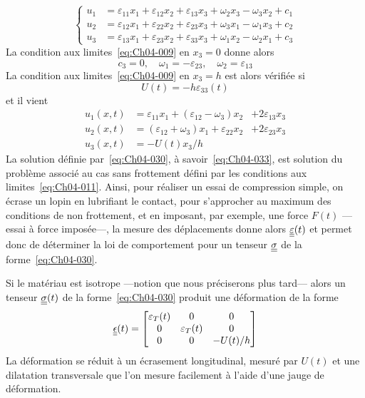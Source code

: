 \begin{equation}
    \left\{
    \begin{aligned}
        u_1 &= \varepsilon_{11} x_1 + \varepsilon_{12}x_2 + \varepsilon_{13}x_3 + \omega_{2}x_3 - \omega_{3} x_2 +c_1\\
        u_2 &= \varepsilon_{12} x_1 + \varepsilon_{22}x_2 + \varepsilon_{23}x_3 + \omega_{3}x_1 - \omega_{1} x_3 +c_2\\
        u_3 &= \varepsilon_{13} x_1 + \varepsilon_{23}x_2 + \varepsilon_{33}x_3 + \omega_{1}x_2 - \omega_{2} x_1 +c_3
    \end{aligned}
    \right.
    \label{eq:Ch04-031}
\end{equation}
La condition aux limites~\eqref{eq:Ch04-009} en $x_3 =0$ donne alors
\begin{equation*}
    c_3 = 0, \quad \omega_1 = -\varepsilon_{23}, \quad \omega_2 = \varepsilon_{13}
\end{equation*}
La condition aux limites~\eqref{eq:Ch04-009}  en $x_3=h$ est alors vérifiée si
\begin{equation}
    U(t) = -h \varepsilon_{33}(t)
    \label{eq:Ch04-032}
\end{equation}
et il vient
\begin{equation}
    \begin{aligned}
        u_1(x,t) &= \varepsilon_{11}x_1 + (\varepsilon_{12} - \omega_3) x_2 &+ 2\varepsilon_{13}x_3 \\
        u_2(x,t) &= (\varepsilon_{12} + \omega_3) x_1 + \varepsilon_{22}x_2 &+ 2\varepsilon_{23}x_3 \\
        u_3(x,t) &= -U(t) x_3/h
    \end{aligned}
    \label{eq:Ch04-033}
\end{equation}
La solution définie par~\eqref{eq:Ch04-030}, à savoir~\eqref{eq:Ch04-033}, est solution du problème associé au cas sans frottement défini par les conditions aux limites~\eqref{eq:Ch04-011}.
Ainsi, pour réaliser un essai de compression simple, on écrase un lopin en lubrifiant le contact, pour s'approcher au maximum des conditions de non frottement, et en imposant, par exemple, une force $F(t)$ ---essai à force imposée---, la mesure des déplacements donne alors $\underline{\underline{\varepsilon}}(t)$ et permet donc de déterminer la loi de comportement pour un tenseur $\underline{\underline{\sigma}}$ de la forme~\eqref{eq:Ch04-030}.

Si le matériau est isotrope ---notion que nous préciserons plus tard--- alors un tenseur $\underline{\underline{\sigma}}(t)$ de la forme~\eqref{eq:Ch04-030} produit une déformation de la forme
\begin{equation}
    \underline{\underline{\epsilon}} (t) = 
    \begin{bmatrix}
        \varepsilon_T(t) & 0 & 0 \\
        0 & \varepsilon_T (t) & 0 \\
        0 & 0 & -U(t)/h
    \end{bmatrix}
    \label{eq:Ch04-034}
\end{equation}
La déformation se réduit à un écrasement longitudinal, mesuré par $U(t)$ et une dilatation transversale que l'on mesure facilement à l'aide d'une jauge de déformation.

